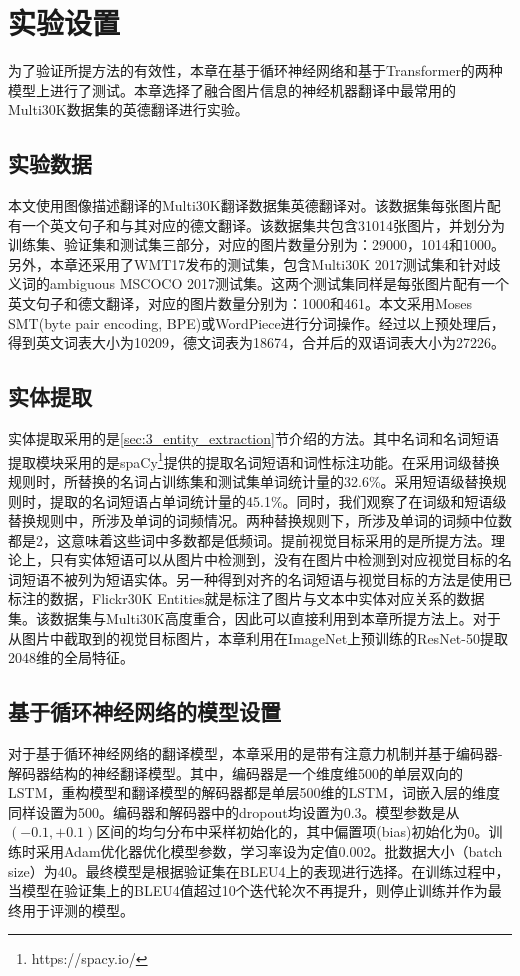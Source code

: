 \section{实验设置}
为了验证所提方法的有效性，本章在基于循环神经网络和基于Transformer的两种模型上进行了测试。本章选择了融合图片信息的神经机器翻译中最常用的Multi30K数据集的英德翻译进行实验。

\subsection{实验数据}
本文使用图像描述翻译的Multi30K翻译数据集英德翻译对。该数据集每张图片配有一个英文句子和与其对应的德文翻译。该数据集共包含31014张图片，并划分为训练集、验证集和测试集三部分，对应的图片数量分别为：29000，1014和1000。另外，本章还采用了WMT17发布的测试集，包含Multi30K 2017测试集和针对歧义词的ambiguous MSCOCO 2017测试集。这两个测试集同样是每张图片配有一个英文句子和德文翻译，对应的图片数量分别为：1000和461。本文采用Moses SMT(byte pair encoding, BPE)或WordPiece进行分词操作。经过以上预处理后，得到英文词表大小为10209，德文词表为18674，合并后的双语词表大小为27226。

\subsection{实体提取}
\label{sec:3_setup_entity_extraction}
实体提取采用的是\ref{sec:3_entity_extraction}节介绍的方法。其中名词和名词短语提取模块采用的是spaCy\footnote{https://spacy.io/}提供的提取名词短语和词性标注功能。在采用词级替换规则时，所替换的名词占训练集和测试集单词统计量的32.6\%。采用短语级替换规则时，提取的名词短语占单词统计量的45.1\%。同时，我们观察了在词级和短语级替换规则中，所涉及单词的词频情况。两种替换规则下，所涉及单词的词频中位数都是2，这意味着这些词中多数都是低频词。提前视觉目标采用的是所提方法。理论上，只有实体短语可以从图片中检测到，没有在图片中检测到对应视觉目标的名词短语不被列为短语实体。另一种得到对齐的名词短语与视觉目标的方法是使用已标注的数据，Flickr30K Entities就是标注了图片与文本中实体对应关系的数据集。该数据集与Multi30K高度重合，因此可以直接利用到本章所提方法上。对于从图片中截取到的视觉目标图片，本章利用在ImageNet上预训练的ResNet-50提取2048维的全局特征。

\subsection{基于循环神经网络的模型设置}
\label{sec:3_rnn_setup}
对于基于循环神经网络的翻译模型，本章采用的是带有注意力机制并基于编码器-解码器结构的神经翻译模型。其中，编码器是一个维度维500的单层双向的LSTM，重构模型和翻译模型的解码器都是单层500维的LSTM，词嵌入层的维度同样设置为500。编码器和解码器中的dropout均设置为0.3。模型参数是从$(-0.1,+0.1)$区间的均匀分布中采样初始化的，其中偏置项(bias)初始化为0。训练时采用Adam优化器优化模型参数，学习率设为定值0.002。批数据大小（batch size）为40。最终模型是根据验证集在BLEU4上的表现进行选择。在训练过程中，当模型在验证集上的BLEU4值超过10个迭代轮次不再提升，则停止训练并作为最终用于评测的模型。

